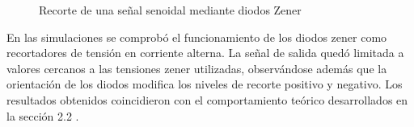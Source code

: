 \begin{figure}[H]
\centering
{}
\caption{Recorte de una señal senoidal mediante diodos Zener}
\end{figure}

En las simulaciones se comprobó el funcionamiento de los diodos zener como recortadores
de tensión en corriente alterna. La señal de salida quedó limitada a valores cercanos a las
tensiones zener utilizadas, observándose además que la orientación de los diodos modifica
los niveles de recorte positivo y negativo. Los resultados obtenidos coincidieron con el
comportamiento teórico  desarrollados en la sección 2.2 .